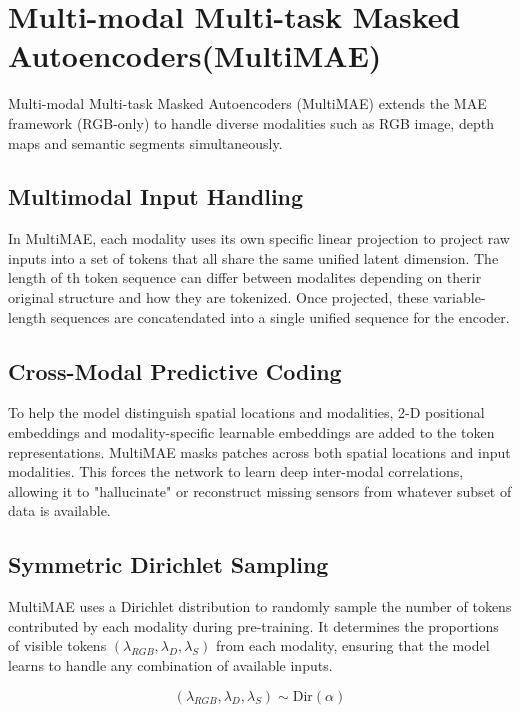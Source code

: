 \section{Multi-modal Multi-task Masked Autoencoders(MultiMAE)}
Multi-modal Multi-task Masked Autoencoders (MultiMAE) \cite{multimae2022} extends
the MAE framework (RGB-only) to handle diverse modalities such as RGB image,
depth maps and semantic segments simultaneously.

\subsection{Multimodal Input Handling}
In MultiMAE, each modality uses its own specific linear projection to project raw
inputs into a set of tokens that all share the same unified latent dimension.
The length of th token sequence can differ between modalites depending on therir
original structure and how they are tokenized. Once projected, these variable-length
sequences are concatendated into a single unified sequence for the encoder.

\subsection{Cross-Modal Predictive Coding}
To help the model distinguish spatial locations and modalities, 2-D positional embeddings
and modality-specific learnable embeddings are added to the token representations.
MultiMAE masks patches across both spatial locations and input modalities. This forces
the network to learn deep inter-modal correlations, allowing it to "hallucinate"
or reconstruct missing sensors from whatever subset of data is available.

\subsection{Symmetric Dirichlet Sampling}
MultiMAE uses a Dirichlet distribution to randomly sample the number of tokens
contributed by each modality during pre-training. It determines the proportions of
visible tokens $(\lambda_{RGB}, \lambda_{D}, \lambda_{S})$ from each modality,
ensuring that the model learns to handle any combination of available inputs.

\begin{equation}
    (\lambda_{RGB}, \lambda_{D}, \lambda_{S}) \sim \text{Dir}(\alpha)
\end{equation}

